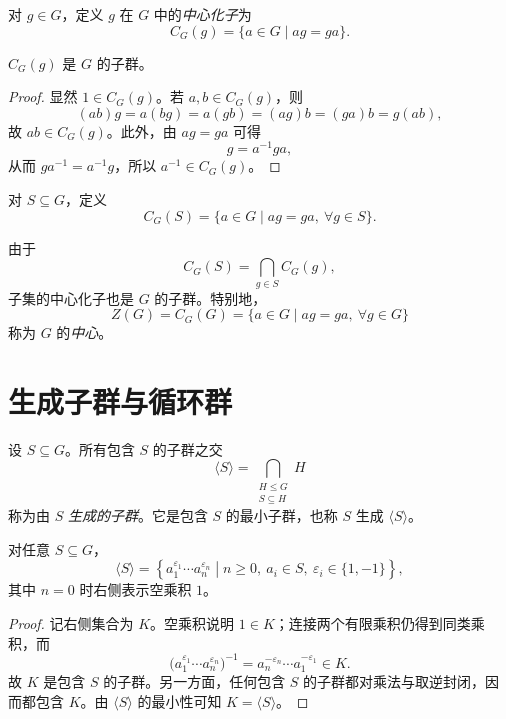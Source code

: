 \begin{definition}[元素的中心化子]
对 $g\in G$，定义 $g$ 在 $G$ 中的\emph{中心化子}为
\[
  C_G(g)=\{a\in G\mid ag=ga\}.
\]
\end{definition}

\begin{proposition}
$C_G(g)$ 是 $G$ 的子群。
\end{proposition}

\begin{proof}
显然 $1\in C_G(g)$。若 $a,b\in C_G(g)$，则
\[
  (ab)g=a(bg)=a(gb)=(ag)b=(ga)b=g(ab),
\]
故 $ab\in C_G(g)$。此外，由 $ag=ga$ 可得
\[
  g=a^{-1}ga,
\]
从而 $ga^{-1}=a^{-1}g$，所以 $a^{-1}\in C_G(g)$。
\end{proof}

\begin{definition}[子集的中心化子]
对 $S\subseteq G$，定义
\[
  C_G(S)=\{a\in G\mid ag=ga,\ \forall g\in S\}.
\]
\end{definition}

由于
\[
  C_G(S)=\bigcap_{g\in S}C_G(g),
\]
子集的中心化子也是 $G$ 的子群。特别地，
\[
  Z(G)=C_G(G)=\{a\in G\mid ag=ga,\ \forall g\in G\}
\]
称为 $G$ 的\emph{中心}。

\section{生成子群与循环群}

\begin{definition}[生成子群]
设 $S\subseteq G$。所有包含 $S$ 的子群之交
\[
  \langle S\rangle
  =\bigcap_{\substack{H\leq G\\S\subseteq H}}H
\]
称为由 $S$ \emph{生成的子群}。它是包含 $S$ 的最小子群，也称 $S$ 生成 $\langle S\rangle$。
\end{definition}

\begin{theorem}
对任意 $S\subseteq G$，
\[
  \langle S\rangle
  =\left\{
    a_1^{\varepsilon_1}\cdots a_n^{\varepsilon_n}
    \middle|
    n\geq 0,\ a_i\in S,\ \varepsilon_i\in\{1,-1\}
  \right\},
\]
其中 $n=0$ 时右侧表示空乘积 $1$。
\end{theorem}

\begin{proof}
记右侧集合为 $K$。空乘积说明 $1\in K$；连接两个有限乘积仍得到同类乘积，而
\[
  \bigl(a_1^{\varepsilon_1}\cdots a_n^{\varepsilon_n}\bigr)^{-1}
  =a_n^{-\varepsilon_n}\cdots a_1^{-\varepsilon_1}\in K.
\]
故 $K$ 是包含 $S$ 的子群。另一方面，任何包含 $S$ 的子群都对乘法与取逆封闭，因而都包含 $K$。由 $\langle S\rangle$ 的最小性可知 $K=\langle S\rangle$。
\end{proof}

